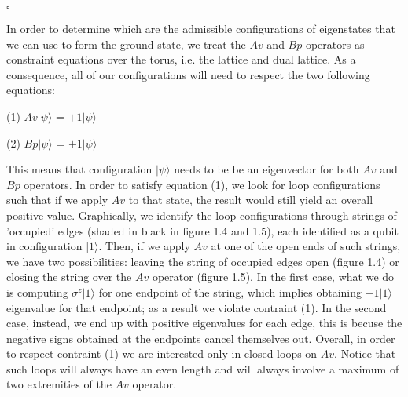 \documentclass{Configuration_Files/PoliMi3i_thesis}
\begin{document}
\hfill $\square$


In order to determine which are the admissible configurations of eigenstates that we can use to form the ground state, we treat the $Av$ and $Bp$ operators as constraint equations over the torus, i.e. the lattice and dual lattice.
As a consequence, all of our configurations will need to respect the two following equations:

\begin{center}
	(1)	$Av|\psi\rangle$ = $+1|\psi\rangle$
\end{center}

\begin{center}
	(2)	$Bp|\psi\rangle$ = $+1|\psi\rangle$
\end{center}

This means that configuration $|\psi\rangle$ needs to be be an eigenvector for both $Av$ and $Bp$ operators. \newline
In order to satisfy equation (1), we look for loop configurations such that if we apply $Av$ to that state, the result would still yield an overall positive value.\newline
Graphically, we identify the loop configurations through strings of 'occupied' edges (shaded in black in figure 1.4 and 1.5), each identified as a qubit in configuration $|1\rangle$. Then, if we apply $Av$ at one of the open ends of such strings, we have two possibilities: leaving the string of occupied edges open (figure 1.4) or closing the string over the $Av$ operator (figure 1.5).
In the first case, what we do is computing $\sigma^{z} |1\rangle$ for one endpoint of the string, which implies obtaining $-1|1\rangle$ eigenvalue for that endpoint; as a result we violate contraint (1). In the second case, instead, we end up with positive eigenvalues for each edge, this is becuse the negative signs obtained at the endpoints cancel themselves out. Overall, in order to respect contraint (1) we are interested only in closed loops on $Av$. Notice that such loops will always have an even length and will always involve a maximum of two extremities of the $Av$ operator.\textit{\cite{Her20}}
\end{document}
